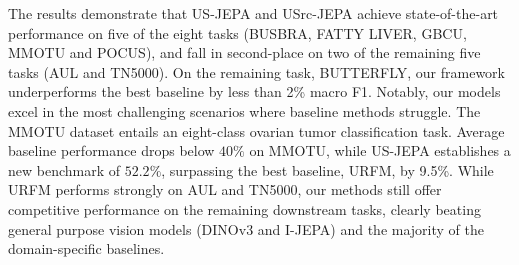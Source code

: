 \documentclass{article}
\theoremstyle{plain}
\theoremstyle{definition}
\theoremstyle{remark}
\begin{document}
The results demonstrate that US-JEPA and USrc-JEPA achieve state-of-the-art performance on five of the eight tasks (BUSBRA, FATTY LIVER, GBCU, MMOTU and POCUS), and fall in second-place on two of the remaining five tasks (AUL and TN5000). On the remaining task, BUTTERFLY, our framework underperforms the best baseline by less than 2\% macro F1. Notably, our models excel in the most challenging scenarios where baseline methods struggle. The MMOTU dataset entails an eight-class ovarian tumor classification task. Average baseline performance drops below $40\%$ on MMOTU, while US-JEPA establishes a new benchmark of $52.2\%$, surpassing the best baseline, URFM, by 9.5\%. While URFM performs strongly on AUL and TN5000, our methods still offer competitive performance on the remaining downstream tasks, clearly beating general purpose vision models (DINOv3 and I-JEPA) and the majority of the domain-specific baselines.
\end{document}
